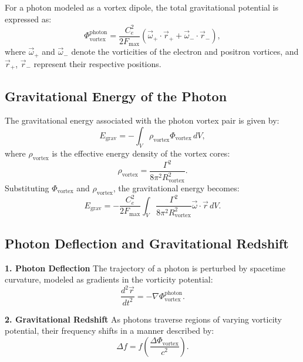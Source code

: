     For a photon modeled as a vortex dipole, the total gravitational potential is expressed as:
    \begin{equation*}
        \Phi_\text{vortex}^\text{photon} = \frac{C_e^2}{2 F_{\max}} \left( \vec{\omega}_+ \cdot \vec{r}_+ + \vec{\omega}_- \cdot \vec{r}_- \right),
    \end{equation*}
    where $\vec{\omega}_+$ and $\vec{\omega}_-$ denote the vorticities of the electron and positron vortices, and $\vec{r}_+$, $\vec{r}_-$ represent their respective positions.

    \subsection*{Gravitational Energy of the Photon}
    The gravitational energy associated with the photon vortex pair is given by:
    \begin{equation*}
        E_\text{grav} = -\int_V \rho_\text{vortex} \Phi_\text{vortex} \, dV,
    \end{equation*}
    where $\rho_\text{vortex}$ is the effective energy density of the vortex cores:
    \begin{equation*}
        \rho_\text{vortex} = \frac{\Gamma^2}{8 \pi^2 R_\text{vortex}^2}.
    \end{equation*}
    Substituting $\Phi_\text{vortex}$ and $\rho_\text{vortex}$, the gravitational energy becomes:
    \begin{equation*}
        E_\text{grav} = -\frac{C_e^2}{2 F_{\max}} \int_V \frac{\Gamma^2}{8 \pi^2 R_\text{vortex}^2} \vec{\omega} \cdot \vec{r} \, dV.
    \end{equation*}

    \subsection*{Photon Deflection and Gravitational Redshift}
    \textbf{1. Photon Deflection}
    The trajectory of a photon is perturbed by spacetime curvature, modeled as gradients in the vorticity potential:
    \begin{equation*}
        \frac{d^2 \vec{r}}{dt^2} = -\nabla \Phi_\text{vortex}^\text{photon}.
    \end{equation*}

    \textbf{2. Gravitational Redshift}
    As photons traverse regions of varying vorticity potential, their frequency shifts in a manner described by:
    \begin{equation*}
        \Delta f = f \left( \frac{\Delta \Phi_\text{vortex}}{c^2} \right).
    \end{equation*}

